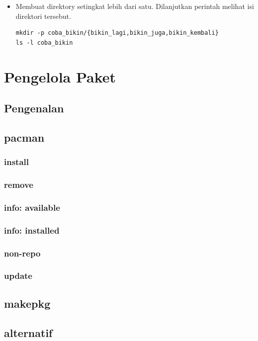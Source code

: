 \documentclass[12pt,]{article}
\begin{document}
\begin{itemize}
\begin{itemize}
			\item Membuat direktory setingkat lebih dari satu.
			Dilanjutkan perintah melihat isi direktori tersebut.
			\begin{verbatim}
mkdir -p coba_bikin/{bikin_lagi,bikin_juga,bikin_kembali}
ls -l coba_bikin
			\end{verbatim}
		\end{itemize}
			
	\end{itemize}
	
	\newpage
	\section{Pengelola Paket}
	\subsection{Pengenalan}
	\subsection{pacman}
	\subsubsection{install}
	\subsubsection{remove}
	\subsubsection{info: available}
	\subsubsection{info: installed}
	\subsubsection{non-repo}
	\subsubsection{update}
	\subsection{makepkg}
	\subsection{alternatif}
	
\end{document}
